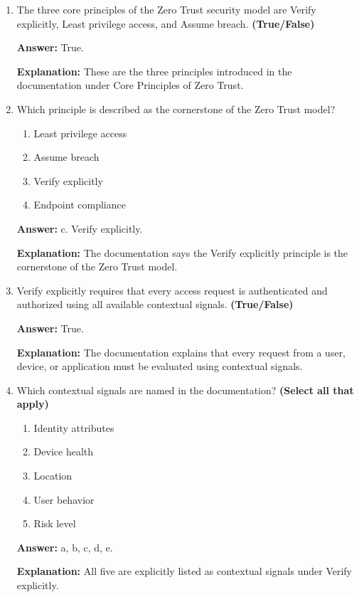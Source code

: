 \documentclass[10pt]{article}
\begin{document}
\begin{enumerate}[leftmargin=*]
\textbf{Explanation:} The documentation lists these four reasons in the Zero Trust conversation diagram.

\item The three core principles of the Zero Trust security model are Verify explicitly, Least privilege access, and Assume breach. \textbf{(True/False)}

\textbf{Answer:} True.

\textbf{Explanation:} These are the three principles introduced in the documentation under Core Principles of Zero Trust.

\item Which principle is described as the cornerstone of the Zero Trust model?
\begin{enumerate}[label=\alph*., leftmargin=1.5em]
\item Least privilege access
\item Assume breach
\item Verify explicitly
\item Endpoint compliance
\end{enumerate}
\textbf{Answer:} c. Verify explicitly.

\textbf{Explanation:} The documentation says the Verify explicitly principle is the cornerstone of the Zero Trust model.

\item Verify explicitly requires that every access request is authenticated and authorized using all available contextual signals. \textbf{(True/False)}

\textbf{Answer:} True.

\textbf{Explanation:} The documentation explains that every request from a user, device, or application must be evaluated using contextual signals.

\item Which contextual signals are named in the documentation? \textbf{(Select all that apply)}
\begin{enumerate}[label=\alph*., leftmargin=1.5em]
\item Identity attributes
\item Device health
\item Location
\item User behavior
\item Risk level
\end{enumerate}
\textbf{Answer:} a, b, c, d, e.

\textbf{Explanation:} All five are explicitly listed as contextual signals under Verify explicitly.


\end{enumerate}
\end{document}
